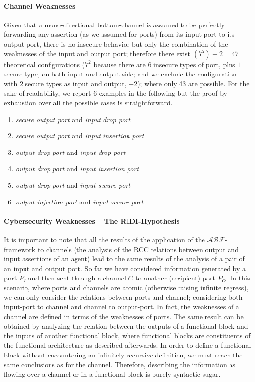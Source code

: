 \documentclass[conference]{IEEEtran}
\newcommand{\assertionRegion}{\mathcal{A}}
\newcommand{\beliefRegion}{\mathcal{B}}
\newcommand{\factRegion}{\mathcal{F}}
\newcommand{\abftheory}{\assertionRegion\beliefRegion\factRegion}
\newcommand{\Rcc}[2]{rcc(#1,#2)}
\begin{document}
\paragraph{Channel Weaknesses}
Given that a mono-directional bottom-channel is assumed to be perfectly
forwarding any assertion (as we assumed for ports) from its input-port to its
output-port, there is no insecure behavior but only the combination of the
weaknesses of the input and output port; therefore there exist $(7^2)-2=47$
theoretical configurations ($7^2$ because there are $6$ insecure types of port,
plus $1$ secure type, on both input and output side; and we exclude the
configuration with $2$ secure types as input and output, $-2$); where only 43
are possible. For the sake of readability, we report 6 examples in the
following but the proof by exhaustion over all the possible cases is
straightforward.

\begin{enumerate}[start=6, label={W\arabic*)}]
	\item \emph{secure output port} and \emph{input drop port}
	\item \emph{secure output port} and \emph{input insertion port}
	\item \emph{output drop port} and \emph{input drop port}
	\item \emph{output drop port} and \emph{input insertion port}
	\item \emph{output drop port} and \emph{input secure port}
	\item \emph{output injection port} and \emph{input secure port}
\end{enumerate}

\paragraph{Cybersecurity Weaknesses -- The RIDI-Hypothesis} 
It is important to note that all the results of the application of the
$\abftheory$-framework to channels (the analysis of the RCC relations
between output and input assertions of an agent)
lead to the same results of the
analysis of a pair of an input and output port.
So far we have
considered information generated by a port $P_I$ and then sent through a
channel $C$ to another (recipient) port $P_O$. In this scenario, where ports and
channels are atomic (otherwise raising infinite regress), we can only
consider the relations between ports and channel; considering both input-port
to channel and channel to output-port.  In fact, the weaknesses of a channel
are defined in terms of the weaknesses of ports.  
The same result can be obtained by analyzing the relation between the outputs
of a functional block and the inputs of another functional block, where
functional blocks are constituents of the functional architecture as described
afterwards.  In order to define a functional block without encountering an
infinitely recursive definition, we must reach the same conclusions as for the
channel. Therefore, describing the information as flowing over a channel or in
a functional block is purely syntactic sugar.
\end{document}
